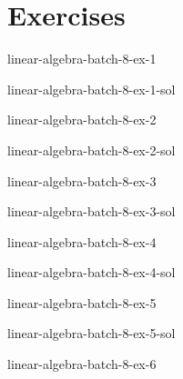 \documentclass[preview]{standalone}
\begin{document}
\genpage

\section{Exercises}

\begin{snippetexercise}{linear-algebra-batch-8-ex-1}{}
    \todo
\end{snippetexercise}

\begin{snippetsolution}{linear-algebra-batch-8-ex-1-sol}{}
    \todo
\end{snippetsolution}

\begin{snippetexercise}{linear-algebra-batch-8-ex-2}{}
    \todo
\end{snippetexercise}

\begin{snippetsolution}{linear-algebra-batch-8-ex-2-sol}{}
    \todo
\end{snippetsolution}

\begin{snippetexercise}{linear-algebra-batch-8-ex-3}{}
    \todo
\end{snippetexercise}

\begin{snippetsolution}{linear-algebra-batch-8-ex-3-sol}{}
    \todo
\end{snippetsolution}

\begin{snippetexercise}{linear-algebra-batch-8-ex-4}{}
    \todo
\end{snippetexercise}

\begin{snippetsolution}{linear-algebra-batch-8-ex-4-sol}{}
    \todo
\end{snippetsolution}

\begin{snippetexercise}{linear-algebra-batch-8-ex-5}{}
    \todo
\end{snippetexercise}

\begin{snippetsolution}{linear-algebra-batch-8-ex-5-sol}{}
    \todo
\end{snippetsolution}

\begin{snippetexercise}{linear-algebra-batch-8-ex-6}{}
    \todo
\end{snippetexercise}
\end{document}
